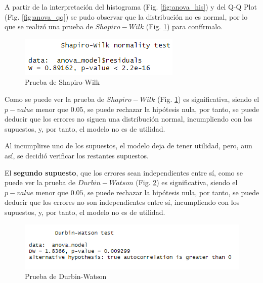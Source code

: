 \documentclass[a4paper,10pt,twocolumn]{article}
\begin{document}
A partir de la interpretación del histograma (Fig. \ref{fig:anova_his}) y del Q-Q Plot (Fig. \ref{fig:anova_qq}) se pudo observar que la distribución no es normal, por lo que se realizó una prueba de $Shapiro-Wilk$ (Fig. \ref{fig:anova_shapiro}) para confírmalo.

\begin{figure}[htb]%
	\begin{center}
		\includegraphics[width=\linewidth]{anova_shapiro}
	\end{center}
	\caption{Prueba de Shapiro-Wilk \label{fig:anova_shapiro}}%
\end{figure}

Como se puede ver la prueba de $Shapiro-Wilk$ (Fig. \ref{fig:anova_shapiro}) es significativa, siendo el $p-value$ menor que $0.05$, se puede rechazar la hipótesis nula, por tanto, se puede deducir que los errores no siguen una distribución normal, incumpliendo con los supuestos, y, por tanto, el modelo no es de utilidad.

Al incumplirse uno de los supuestos, el modelo deja de tener utilidad, pero, aun así, se decidió verificar los restantes supuestos.

El \textbf{segundo supuesto}, que los errores sean independientes entre sí, como se puede ver la prueba de $Durbin-Watson$ (Fig. \ref{fig:anova_dwtest}) es significativa, siendo el $p-value$ menor que $0.05$, se puede rechazar la hipótesis nula, por tanto, se puede deducir que los errores no son independientes entre sí, incumpliendo con los supuestos, y, por tanto, el modelo no es de utilidad.

\begin{figure}[htb]%
	\begin{center}
		\includegraphics[width=\linewidth]{anova_dwtest}
	\end{center}
	\caption{Prueba de Durbin-Watson \label{fig:anova_dwtest}}%
\end{figure}
\end{document}
